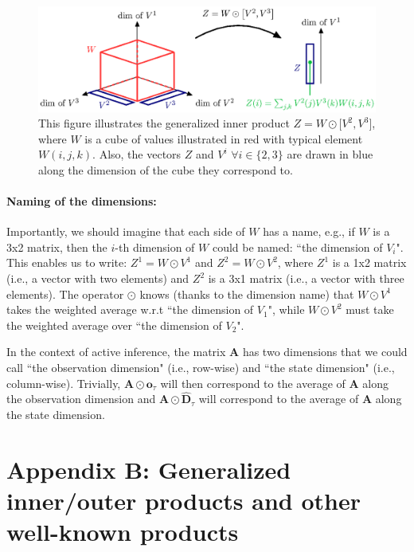\documentclass[twoside,11pt]{article}
\begin{document}
\begin{figure}[H]
	\begin{center}
	\includegraphics[scale=0.8]{BTAI-figure8}
	\end{center}
  \caption{This figure illustrates the generalized inner product $Z = W \odot \big[ V^2, V^3 \big]$, where $W$ is a cube of values illustrated in red with typical element $W(i,j,k)$. Also, the vectors $Z$ and $V^i \,\, \forall i \in \{2,3\}$ are drawn in blue along the dimension of the cube they correspond to.}
   \label{fig:inner-product}
\end{figure}

\paragraph{Naming of the dimensions:}

Importantly, we should imagine that each side of $W$ has a name, e.g., if $W$ is a 3x2 matrix, then the $i$-th dimension of $W$ could be named: ``the dimension of $V_i$". This enables us to write: $Z^1 = W \odot V^1$ and $Z^2 = W \odot V^2$, where $Z^1$ is a 1x2 matrix (i.e., a vector with two elements) and $Z^2$ is a 3x1 matrix (i.e., a vector with three elements). The operator $\odot$ knows (thanks to the dimension name) that $W \odot V^1$ takes the weighted average w.r.t ``the dimension of $V_1$", while $W \odot V^2$ must take the weighted average over ``the dimension of $V_2$".

In the context of active inference, the matrix $\bm{A}$ has two dimensions that we could call ``the observation dimension" (i.e., row-wise) and ``the state dimension" (i.e., column-wise). Trivially, $\bm{A} \odot \bm{o}_\tau$ will then correspond to the average of $\bm{A}$ along the observation dimension and $\bm{A} \odot \bm{\hat{D}}_\tau$ will correspond to the average of $\bm{A}$ along the state dimension. 

\section*{Appendix B: Generalized inner/outer products and other well-known products}
\end{document}
